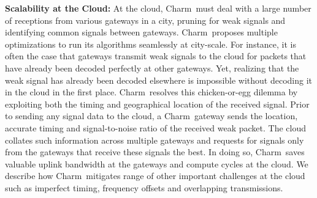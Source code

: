 

\noindent \textbf{Scalability at the Cloud:} At the cloud, Charm\ must deal with a large number of receptions from various gateways in a city, pruning for weak signals and identifying common signals between gateways. Charm\ proposes multiple optimizations to run its algorithms seamlessly at city-scale. For instance, it is often the case that gateways transmit weak signals to the cloud for packets that have already been decoded perfectly at other gateways. Yet, realizing that the weak signal has already been decoded elsewhere is impossible without decoding it in the cloud in the first place. Charm\ resolves this chicken-or-egg dilemma by exploiting both the timing and geographical location of the received signal. Prior to sending any signal data to the cloud, a Charm\ gateway sends the location, accurate timing and signal-to-noise ratio of the received weak packet. The cloud collates such information across multiple gateways and requests for signals only from the gateways that receive these signals the best. In doing so, Charm\ saves valuable uplink bandwidth at the gateways and compute cycles at the cloud. We describe how Charm\ mitigates  range of other important challenges at the cloud such as imperfect timing, frequency offsets and overlapping transmissions. 



